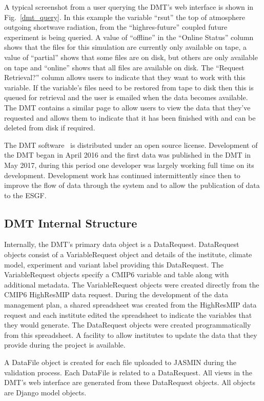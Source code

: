 \documentclass[gmd, manuscript]{copernicus}
\begin{document}
A typical screenshot from a user querying the DMT's web interface is shown in Fig.~\ref{dmt_query}. In this example the variable ``rsut'' the top of atmosphere outgoing shortwave radiation, from the ``highres-future'' coupled future experiment is being queried. A value of ``offline'' in the ``Online Status'' column shows that the files for this simulation are currently only available on tape, a value of ``partial'' shows that some files are on disk, but others are only available on tape and ``online'' shows that all files are available on disk. The ``Request Retrieval?'' column allows users to indicate that they want to work with this variable. If the variable's files need to be restored from tape to disk then this is queued for retrieval and the user is emailed when the data becomes available. The DMT contains a similar page to allow users to view the data that they've requested and allows them to indicate that it has been finished with and can be deleted from disk if required.

The DMT software~\citep{Seddon2019} is distributed under an open source license. Development of the DMT began in April 2016 and the first data was published in the DMT in May 2017, during this period one developer was largely working full time on its development. Development work has continued intermittently since then to improve the flow of data through the system and to allow the publication of data to the ESGF. 


\subsection{DMT Internal Structure}
Internally, the DMT's primary data object is a DataRequest. DataRequest objects consist of a VariableRequest object and details of the institute, climate model, experiment and variant label providing this DataRequest. The VariableRequest objects specify a CMIP6 variable and table along with additional metadata. The VariableRequest objects were created directly from the CMIP6 HighResMIP data request. During the development of the data management plan, a shared spreadsheet was created from the HighResMIP data request and each institute edited the spreadsheet to indicate the variables that they would generate. The DataRequest objects were created programmatically from this spreadsheet. A facility to allow institutes to update the data that they provide during the project is available.

A DataFile object is created for each file uploaded to JASMIN during the validation process. Each DataFile is related to a DataRequest. All views in the DMT's web interface are generated from these DataRequest objects. All objects are Django model objects.
\end{document}
